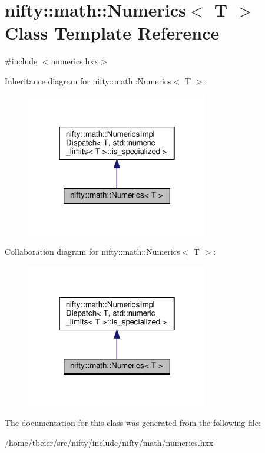 \hypertarget{classnifty_1_1math_1_1Numerics}{}\section{nifty\+:\+:math\+:\+:Numerics$<$ T $>$ Class Template Reference}
\label{classnifty_1_1math_1_1Numerics}


{\ttfamily \#include $<$numerics.\+hxx$>$}



Inheritance diagram for nifty\+:\+:math\+:\+:Numerics$<$ T $>$\+:
\nopagebreak
\begin{figure}[H]
\begin{center}
\leavevmode
\includegraphics[width=226pt]{classnifty_1_1math_1_1Numerics__inherit__graph}
\end{center}
\end{figure}


Collaboration diagram for nifty\+:\+:math\+:\+:Numerics$<$ T $>$\+:
\nopagebreak
\begin{figure}[H]
\begin{center}
\leavevmode
\includegraphics[width=226pt]{classnifty_1_1math_1_1Numerics__coll__graph}
\end{center}
\end{figure}


The documentation for this class was generated from the following file\+:\begin{DoxyCompactItemize}
\item 
/home/tbeier/src/nifty/include/nifty/math/\hyperlink{numerics_8hxx}{numerics.\+hxx}\end{DoxyCompactItemize}
